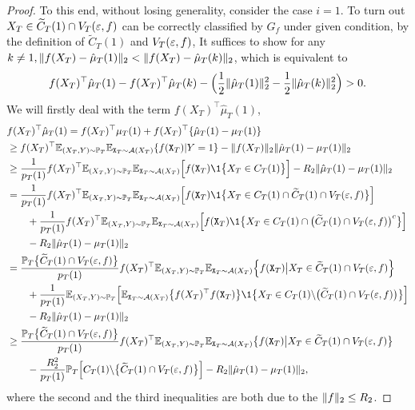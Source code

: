 \begin{proof}
To this end, without losing generality, consider the case $i = 1$. To turn out $X_T \in \widetilde{C}_T(1) \cap V_T(\varepsilon, f)$ can be correctly classified by $G_f$ under given condition, by the definition of $\widetilde{C}_T(1)$ and $V_T(\varepsilon, f)$, It suffices to show for any $k \neq 1, \Vert{f(X_T) - \hat{\mu}_T(1)}\Vert_2 < \Vert{f(X_T) - \hat{\mu}_T(k)}\Vert_2$, which is equivalent to
\begin{align}\label{eq: sufficient condition to be classified as 1}
f(X_T)^{\top}\hat{\mu}_T(1) - f(X_T)^\top\hat{\mu}_T(k) - \Big(\frac{1}{2}\Vert{\hat{\mu}_T(1)}\Vert^2_2 - \frac{1}{2}\Vert{\hat{\mu}_T(k)}\Vert^2_2\Big) > 0.
\end{align}
We will firstly deal with the term $f(X_T)^\top\hat{\mu}_T(1)$,
\begin{align}
\label{eq: f(x)μ1 (1)}
&f(X_T)^{\top}\hat{\mu}_T(1) = f(X_T)^\top\mu_T(1) + f(X_T)^\top\{\hat{\mu}_T(1) - \mu_T(1)\} \nonumber\\
&\geq f(X_T)^{\top}\E_{(X_T, Y) \sim \P_T}\E_{\mathtt{X}_T \sim \mathcal{A}(X_T)}\{f(\mathtt{X}_T) \vert Y = 1\} - \norm{f(X_T)}_2\norm{\hat{\mu}_T(1) - \mu_T(1)}_2 \nonumber\\
&\geq \frac{1}{p_T(1)}f(X_T)^\top\E_{(X_T, Y) \sim \P_T}\E_{\mathtt{X}_T \sim \mathcal{A}(X_T)}\Big[f(\mathtt{X}_T)\1\big\{X_T \in C_T(1)\big\}\Big] - R_2\norm{\hat{\mu}_T(1) - \mu_T(1)}_2 \nonumber\\
&= \frac{1}{p_T(1)}f(X_T)^{\top}\E_{(X_T, Y) \sim \P_T}\E_{\mathtt{X}_T \sim \mathcal{A}(X_T)}\Big[f(\mathtt{X}_T)\1\big\{X_T \in C_T(1) \cap \widetilde{C}_T(1) \cap V_T(\eps, f)\big\}\Big] \nonumber\\
&\qquad + \frac{1}{p_T(1)}f(X_T)^\top\E_{(X_T, Y) \sim \P_T}\E_{\mathtt{X}_T \sim \mathcal{A}(X_T)}\Big[f(\mathtt{X}_T)\1\big\{X_T \in C_T(1) \cap \big(\widetilde{C}_T(1) \cap V_T(\eps, f)\big)^c\big\}\Big] \nonumber \\
&\qquad - R_2\norm{\hat{\mu}_T(1) - \mu_T(1)}_2 \nonumber\\
&= \frac{\P_T\big\{\widetilde{C}_T(1) \cap V_T(\eps, f)\big\}}{p_T(1)}f(X_T)^\top\E_{(X_T ,Y) \sim \P_T}\E_{\mathtt{X}_T \sim \mathcal{A}(X_T)}\Big\{f(\mathtt{X}_T) \big\vert X_T \in \widetilde{C}_T(1) \cap V_T(\eps, f)\Big\} \nonumber \\
&\qquad + \frac{1}{p_T(1)}\E_{(X_T, Y) \sim \P_T}\Big[\E_{\mathtt{X}_T \sim \mathcal{A}(X_T)}\big\{f(X_T)^\top f(\mathtt{X}_T)\big\}\1\big\{X_T \in C_T(1) \backslash \big(\widetilde{C}_T(1) \cap V_T(\eps, f)\big)\big\}\Big] \nonumber \\
&\qquad - R_2\norm{\hat{\mu}_T(1) - \mu_T(1)}_2 \nonumber\\
&\geq \frac{\P_T\big\{\widetilde{C}_T(1) \cap V_T(\eps, f)\big\}}{p_T(1)}f(X_T)^{\top}\E_{(X_T ,Y) \sim \P_T}\E_{\mathtt{X}_T \sim \mathcal{A}(X_T)}\big\{f(\mathtt{X}_T) \big\vert X_T \in \widetilde{C}_T(1) \cap V_T(\eps, f)\big\} \nonumber\\
&\qquad- \frac{R_2^2}{p_T(1)}\P_T\Big[C_T(1) \backslash \big\{\widetilde{C}_T(1) \cap V_T(\eps, f)\big\}\Big] - R_2\norm{\hat{\mu}_T(1) - \mu_T(1)}_2,
\end{align}
where the second and the third inequalities are both due to the $\Vert{f}\Vert_2 \leq R_2$. 


\end{proof}
